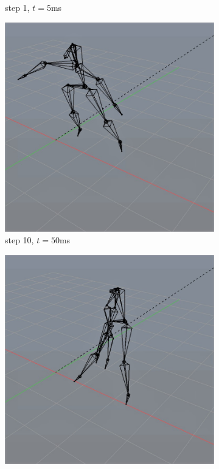 \documentclass[10pt,twocolumn,letterpaper]{article}
\begin{document}
\begin{figure}
\begin{subfigure}{0.2\textwidth}
        \caption{step 1, $t=5$ms}
    \end{subfigure}\begin{subfigure}{0.2\textwidth}
        \centering
        \includegraphics[width=.9\linewidth]{linear-cannon-50.jpg}
        \caption{step 10, $t=50$ms}
    \end{subfigure}\begin{subfigure}{0.2\textwidth}
        \centering
        \includegraphics[width=.9\linewidth]{linear-cannon-500.jpg}

\end{subfigure}
\end{figure}
\end{document}
